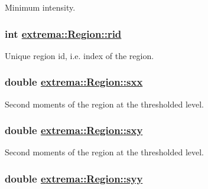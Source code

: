 Minimum intensity. 

\hypertarget{structextrema_1_1Region_1d9e7bc7ce711d2caac59bc92db17991}{
\subsubsection[rid]{\setlength{\rightskip}{0pt plus 5cm}int \hyperlink{structextrema_1_1Region_1d9e7bc7ce711d2caac59bc92db17991}{extrema::Region::rid}}}
\label{structextrema_1_1Region_1d9e7bc7ce711d2caac59bc92db17991}


Unique region id, i.e. index of the region. 

\hypertarget{structextrema_1_1Region_141bd540c32bfafeee3ed1ffe900955e}{
\subsubsection[sxx]{\setlength{\rightskip}{0pt plus 5cm}double \hyperlink{structextrema_1_1Region_141bd540c32bfafeee3ed1ffe900955e}{extrema::Region::sxx}}}
\label{structextrema_1_1Region_141bd540c32bfafeee3ed1ffe900955e}


Second moments of the region at the thresholded level. 

\hypertarget{structextrema_1_1Region_a9d4087d7225ac9a51d06ad0bf554eb8}{
\subsubsection[sxy]{\setlength{\rightskip}{0pt plus 5cm}double \hyperlink{structextrema_1_1Region_a9d4087d7225ac9a51d06ad0bf554eb8}{extrema::Region::sxy}}}
\label{structextrema_1_1Region_a9d4087d7225ac9a51d06ad0bf554eb8}


Second moments of the region at the thresholded level. 

\hypertarget{structextrema_1_1Region_6e8a4404c22fc3b9f318e12d42700cac}{
\subsubsection[syy]{\setlength{\rightskip}{0pt plus 5cm}double \hyperlink{structextrema_1_1Region_6e8a4404c22fc3b9f318e12d42700cac}{extrema::Region::syy}}}
\label{structextrema_1_1Region_6e8a4404c22fc3b9f318e12d42700cac}


